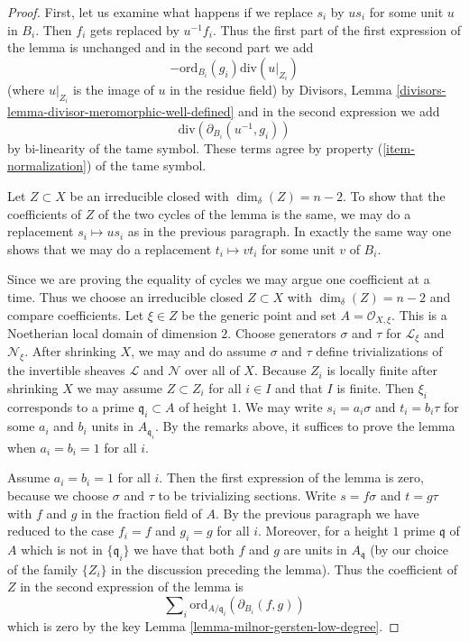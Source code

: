 \begin{proof}
First, let us examine what happens if we replace $s_i$ by $us_i$
for some unit $u$ in $B_i$. Then $f_i$ gets replaced by $u^{-1} f_i$.
Thus the first part of the first expression of the lemma is unchanged
and in the second part we add
$$
-\text{ord}_{B_i}(g_i)\text{div}(u|_{Z_i})
$$
(where $u|_{Z_i}$ is the image of $u$ in the residue field) by
Divisors, Lemma \ref{divisors-lemma-divisor-meromorphic-well-defined}
and in the second expression we add
$$
\text{div}(\partial_{B_i}(u^{-1}, g_i))
$$
by bi-linearity of the tame symbol. These terms agree by property
(\ref{item-normalization}) of the tame symbol.

\medskip\noindent
Let $Z \subset X$ be an irreducible closed with $\dim_\delta(Z) = n - 2$.
To show that the coefficients of $Z$ of the two cycles of the lemma
is the same, we may do a replacement $s_i \mapsto us_i$ as in the previous
paragraph. In exactly the same way one shows that we may do a replacement
$t_i \mapsto vt_i$ for some unit $v$ of $B_i$.

\medskip\noindent
Since we are proving the equality of cycles we may argue one coefficient
at a time. Thus we choose an irreducible closed $Z \subset X$
with $\dim_\delta(Z) = n - 2$ and compare coefficients. Let $\xi \in Z$
be the generic point and set $A = \mathcal{O}_{X, \xi}$. This is a Noetherian
local domain of dimension $2$. Choose generators $\sigma$ and $\tau$
for $\mathcal{L}_\xi$ and $\mathcal{N}_\xi$. After shrinking $X$, we may
and do assume $\sigma$ and $\tau$ define trivializations
of the invertible sheaves $\mathcal{L}$ and $\mathcal{N}$ over all of $X$.
Because $Z_i$ is locally
finite after shrinking $X$ we may assume $Z \subset Z_i$ for all $i \in I$
and that $I$ is finite. Then $\xi_i$ corresponds to a prime
$\mathfrak q_i \subset A$ of height $1$.
We may write $s_i = a_i \sigma$ and $t_i = b_i \tau$
for some $a_i$ and $b_i$ units in $A_{\mathfrak q_i}$.
By the remarks above, it suffices to prove the lemma when
$a_i = b_i = 1$ for all $i$.

\medskip\noindent
Assume $a_i = b_i = 1$ for all $i$. Then the first expression of the
lemma is zero, because we choose $\sigma$ and $\tau$ to be trivializing
sections. Write $s = f\sigma$ and $t = g \tau$ with $f$ and $g$ in the
fraction field of $A$. By the previous paragraph we have reduced to the case
$f_i = f$ and $g_i = g$ for all $i$. Moreover, for a height $1$ prime
$\mathfrak q$ of $A$ which is not in $\{\mathfrak q_i\}$ we have
that both $f$ and $g$ are units in $A_\mathfrak q$ (by our choice of
the family $\{Z_i\}$ in the discussion preceding the lemma). Thus
the coefficient of $Z$ in the second expression of the lemma is
$$
\sum\nolimits_i \text{ord}_{A/\mathfrak q_i}(\partial_{B_i}(f, g))
$$
which is zero by the key Lemma \ref{lemma-milnor-gersten-low-degree}.
\end{proof}






